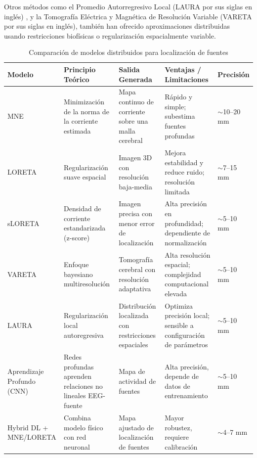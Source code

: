 Otros métodos como el Promedio Autorregresivo Local (LAURA por sus siglas en inglés) \cite{GraveDePeralta2004}, y la Tomografía Eléctrica y Magnética de Resolución Variable (VARETA por sus siglas en inglés)\cite{ValdesSosa2000}, también han ofrecido aproximaciones distribuidas usando restricciones biofísicas o regularización espacialmente variable.

\begin{table}[H]
\centering
\caption{Comparación de modelos distribuidos para localización de fuentes}
\begin{tabular}{|p{3cm}|p{3cm}|p{3.5cm}|p{3cm}|p{2.5cm}|}
\hline
\textbf{Modelo} & \textbf{Principio Teórico} & \textbf{Salida Generada} & \textbf{Ventajas / Limitaciones} & \textbf{Precisión} \\
\hline
MNE & Minimización de la norma de la corriente estimada & Mapa continuo de corriente sobre una malla cerebral & Rápido y simple; subestima fuentes profundas & $\sim$10--20 mm \cite{Grech2008} \\
\hline
LORETA & Regularización suave espacial & Imagen 3D con resolución baja-media & Mejora estabilidad y reduce ruido; resolución limitada & $\sim$7--15 mm \cite{Grech2008} \\
\hline
sLORETA & Densidad de corriente estandarizada (z-score) & Imagen precisa con menor error de localización & Alta precisión en profundidad; dependiente de normalización & $\sim$5--10 mm \cite{PascualMarqui2002} \\
\hline
VARETA & Enfoque bayesiano multiresolución & Tomografía cerebral con resolución adaptativa & Alta resolución espacial; complejidad computacional elevada & $\sim$5--10 mm \cite{BoschBayard2001} \\
\hline
LAURA & Regularización local autoregresiva & Distribución localizada con restricciones espaciales & Optimiza precisión local; sensible a configuración de parámetros & $\sim$5--10 mm \cite{GraveDePeralta2004} \\
\hline
Aprendizaje Profundo (CNN) & Redes profundas aprenden relaciones no lineales EEG-fuente & Mapa de actividad de fuentes & Alta precisión, depende de datos de entrenamiento & $\sim$5--10 mm \cite{Hecker2021CNN} \\
\hline
Hybrid DL + MNE/LORETA & Combina modelo físico con red neuronal & Mapa ajustado de localización de fuentes & Mayor robustez, requiere calibración & $\sim$4--7 mm \cite{Zhang2021HybridEEG} \\
\hline
\end{tabular}
\end{table}



